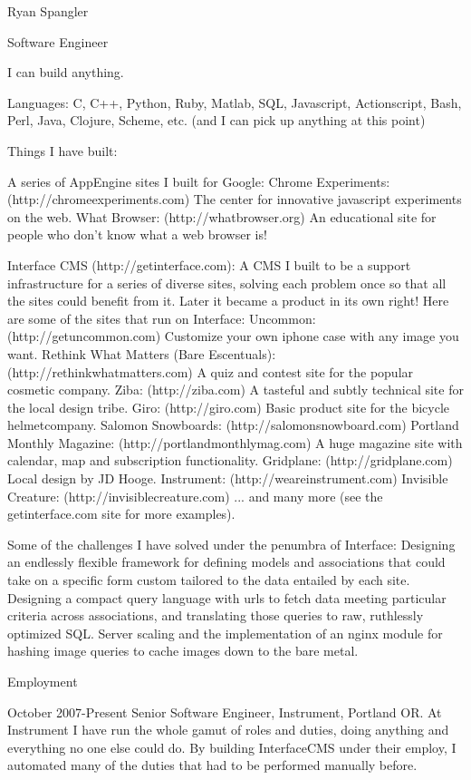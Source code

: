 Ryan Spangler

Software Engineer
 
I can build anything.

Languages:
C, C++, Python, Ruby, Matlab, SQL, Javascript, Actionscript, Bash, Perl, Java, Clojure, Scheme, etc. (and I can pick up anything at this point)

Things I have built:

A series of AppEngine sites I built for Google:
  Chrome Experiments: (http://chromeexperiments.com) The center for innovative javascript experiments on the web.
  What Browser: (http://whatbrowser.org) An educational site for people who don't know what a web browser is!

Interface CMS (http://getinterface.com):  A CMS I built to be a support infrastructure for a series of diverse sites, solving each problem once so that all the sites could benefit from it.  Later it became a product in its own right!  Here are some of the sites that run on Interface:
  Uncommon: (http://getuncommon.com) Customize your own iphone case with any image you want.
  Rethink What Matters (Bare Escentuals): (http://rethinkwhatmatters.com) A quiz and contest site for the popular cosmetic company.
  Ziba: (http://ziba.com) A tasteful and subtly technical site for the local design tribe.
  Giro: (http://giro.com) Basic product site for the bicycle helmetcompany.
  Salomon Snowboards: (http://salomonsnowboard.com)
  Portland Monthly Magazine: (http://portlandmonthlymag.com) A huge magazine site with calendar, map and subscription functionality.
  Gridplane: (http://gridplane.com) Local design by JD Hooge.
  Instrument: (http://weareinstrument.com)
  Invisible Creature: (http://invisiblecreature.com)
  ... and many more (see the getinterface.com site for more examples).

Some of the challenges I have solved under the penumbra of Interface:
  Designing an endlessly flexible framework for defining models and associations that could take on a specific form custom tailored to the data entailed by each site.
  Designing a compact query language with urls to fetch data meeting particular criteria across associations, and translating those queries to raw, ruthlessly optimized SQL.
  Server scaling and the implementation of an nginx module for hashing image queries to cache images down to the bare metal. 

Employment

October 2007-Present  Senior Software Engineer, Instrument, Portland OR.  At Instrument I have run the whole gamut of roles and duties, doing anything and everything no one else could do.  By building InterfaceCMS under their employ, I automated many of the duties that had to be performed manually before.  

